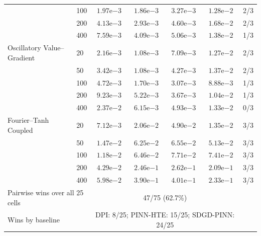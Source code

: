 \documentclass[10pt]{article}
\begin{document}
\begin{table}[t]
\begin{tabular}{llccccc}
 & 100 & $1.97\mathrm{e}{-3}$ & \textbf{$1.86\mathrm{e}{-3}$} & $3.27\mathrm{e}{-3}$ & $1.28\mathrm{e}{-2}$ & 2/3 \\
 & 200 & $4.13\mathrm{e}{-3}$ & \textbf{$2.93\mathrm{e}{-3}$} & $4.60\mathrm{e}{-3}$ & $1.68\mathrm{e}{-2}$ & 2/3 \\
 & 400 & $7.59\mathrm{e}{-3}$ & \textbf{$4.09\mathrm{e}{-3}$} & $5.06\mathrm{e}{-3}$ & $1.38\mathrm{e}{-2}$ & 1/3 \\
\addlinespace[2pt]
Oscillatory Value--Gradient & 20 & $2.16\mathrm{e}{-3}$ & \textbf{$1.08\mathrm{e}{-3}$} & $7.09\mathrm{e}{-3}$ & $1.27\mathrm{e}{-2}$ & 2/3 \\
 & 50 & $3.42\mathrm{e}{-3}$ & \textbf{$1.08\mathrm{e}{-3}$} & $4.27\mathrm{e}{-3}$ & $1.37\mathrm{e}{-2}$ & 2/3 \\
 & 100 & $4.72\mathrm{e}{-3}$ & \textbf{$1.70\mathrm{e}{-3}$} & $3.07\mathrm{e}{-3}$ & $8.88\mathrm{e}{-3}$ & 1/3 \\
 & 200 & $9.23\mathrm{e}{-3}$ & $5.22\mathrm{e}{-3}$ & \textbf{$3.67\mathrm{e}{-3}$} & $1.04\mathrm{e}{-2}$ & 1/3 \\
 & 400 & $2.37\mathrm{e}{-2}$ & $6.15\mathrm{e}{-3}$ & \textbf{$4.93\mathrm{e}{-3}$} & $1.33\mathrm{e}{-2}$ & 0/3 \\
\addlinespace[2pt]
Fourier--Tanh Coupled & 20 & \textbf{$7.12\mathrm{e}{-3}$} & $2.06\mathrm{e}{-2}$ & $4.90\mathrm{e}{-2}$ & $1.35\mathrm{e}{-2}$ & 3/3 \\
 & 50 & \textbf{$1.47\mathrm{e}{-2}$} & $6.25\mathrm{e}{-2}$ & $6.55\mathrm{e}{-2}$ & $5.13\mathrm{e}{-2}$ & 3/3 \\
 & 100 & \textbf{$1.18\mathrm{e}{-2}$} & $6.46\mathrm{e}{-2}$ & $7.71\mathrm{e}{-2}$ & $7.41\mathrm{e}{-2}$ & 3/3 \\
 & 200 & \textbf{$4.29\mathrm{e}{-2}$} & $2.46\mathrm{e}{-1}$ & $2.62\mathrm{e}{-1}$ & $2.09\mathrm{e}{-1}$ & 3/3 \\
 & 400 & \textbf{$5.98\mathrm{e}{-2}$} & $3.90\mathrm{e}{-1}$ & $4.01\mathrm{e}{-1}$ & $2.33\mathrm{e}{-1}$ & 3/3 \\
\midrule
\multicolumn{2}{l}{Pairwise wins over all 25 cells} & \multicolumn{4}{c}{47/75 (62.7\%)} & \\
\multicolumn{2}{l}{Wins by baseline} & \multicolumn{4}{c}{DPI: 8/25; PINN-HTE: 15/25; SDGD-PINN: 24/25} & \\
\bottomrule
\end{tabular}
\end{table}
\end{document}
